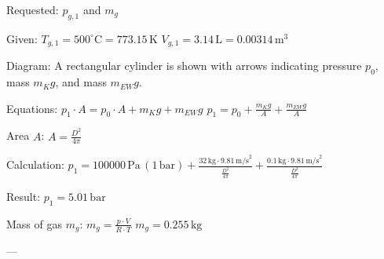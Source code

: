 Requested: \( p_{g,1} \) and \( m_g \)  

Given:  
\( T_{g,1} = 500^\circ \text{C} = 773.15 \, \text{K} \)  
\( V_{g,1} = 3.14 \, \text{L} = 0.00314 \, \text{m}^3 \)  

Diagram: A rectangular cylinder is shown with arrows indicating pressure \( p_0 \), mass \( m_K g \), and mass \( m_{EW} g \).  

Equations:  
\( p_1 \cdot A = p_0 \cdot A + m_K g + m_{EW} g \)  
\( p_1 = p_0 + \frac{m_K g}{A} + \frac{m_{EW} g}{A} \)  

Area \( A \):  
\( A = \frac{D^2}{4 \pi} \)  

Calculation:  
\( p_1 = 100000 \, \text{Pa} \, (1 \, \text{bar}) + \frac{32 \, \text{kg} \cdot 9.81 \, \text{m/s}^2}{\frac{D^2}{4 \pi}} + \frac{0.1 \, \text{kg} \cdot 9.81 \, \text{m/s}^2}{\frac{D^2}{4 \pi}} \)  

Result:  
\( p_1 = 5.01 \, \text{bar} \)  

Mass of gas \( m_g \):  
\( m_g = \frac{p \cdot V}{R \cdot T} \)  
\( m_g = 0.255 \, \text{kg} \)  

---